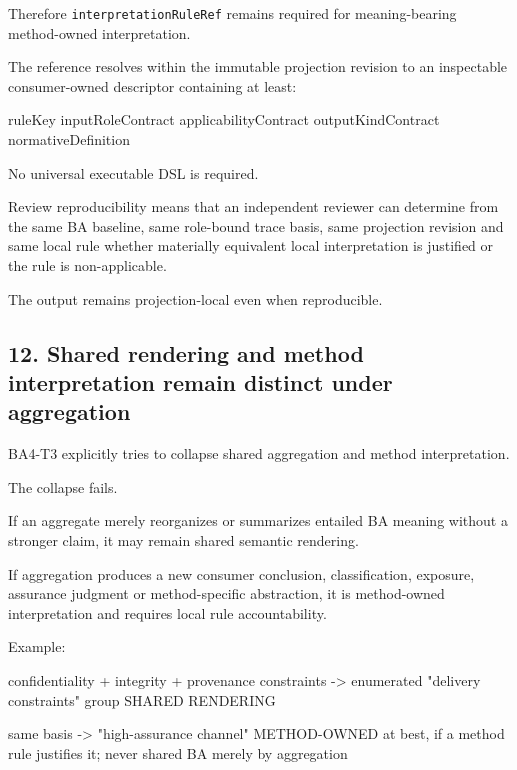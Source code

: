 \documentclass[
  11pt,
  a4paper,
]{article}
\newenvironment{Shaded}{}{}
\newcommand{\NormalTok}[1]{#1}
\begin{document}
Therefore \texttt{interpretationRuleRef} remains required for
meaning-bearing method-owned interpretation.

The reference resolves within the immutable projection revision to an
inspectable consumer-owned descriptor containing at least:

\begin{Shaded}
\begin{Highlighting}[]
\NormalTok{ruleKey}
\NormalTok{inputRoleContract}
\NormalTok{applicabilityContract}
\NormalTok{outputKindContract}
\NormalTok{normativeDefinition}
\end{Highlighting}
\end{Shaded}

No universal executable DSL is required.

Review reproducibility means that an independent reviewer can determine
from the same BA baseline, same role-bound trace basis, same projection
revision and same local rule whether materially equivalent local
interpretation is justified or the rule is non-applicable.

The output remains projection-local even when reproducible.

\subsection{12. Shared rendering and method interpretation remain
distinct under
aggregation}\label{shared-rendering-and-method-interpretation-remain-distinct-under-aggregation}

BA4-T3 explicitly tries to collapse shared aggregation and method
interpretation.

The collapse fails.

If an aggregate merely reorganizes or summarizes entailed BA meaning
without a stronger claim, it may remain shared semantic rendering.

If aggregation produces a new consumer conclusion, classification,
exposure, assurance judgment or method-specific abstraction, it is
method-owned interpretation and requires local rule accountability.

Example:

\begin{Shaded}
\begin{Highlighting}[]
\NormalTok{confidentiality + integrity + provenance constraints}
\NormalTok{    {-}\textgreater{} enumerated "delivery constraints" group}
\NormalTok{       SHARED RENDERING}

\NormalTok{same basis}
\NormalTok{    {-}\textgreater{} "high{-}assurance channel"}
\NormalTok{       METHOD{-}OWNED at best, if a method rule justifies it;}
\NormalTok{       never shared BA merely by aggregation}
\end{Highlighting}
\end{Shaded}
\end{document}
